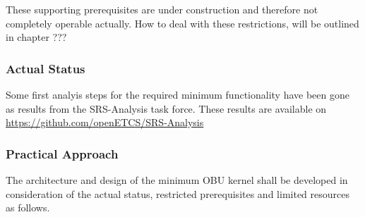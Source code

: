 These supporting prerequisites are under construction and therefore not completely operable actually. How to deal with these restrictions, will be outlined in chapter ???

\subsubsection{Actual Status}
\label{sec:ActualStatus}

Some first analyis steps for the required minimum functionality have been gone as results from the SRS-Analysis task force. These results are available on \url{https://github.com/openETCS/SRS-Analysis}


\subsubsection{Practical Approach}
\label{sec:PracticalApproach}

The architecture and design of the minimum OBU kernel shall be developed in consideration of the actual status, restricted prerequisites and limited resources as follows. 
